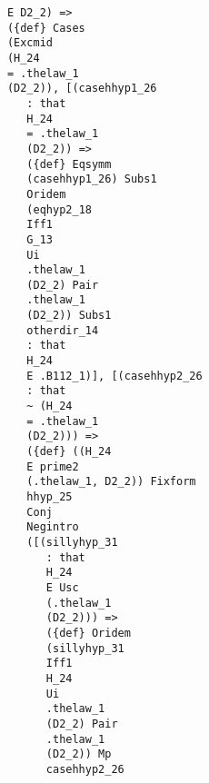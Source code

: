 \documentclass[12pt]{article}
\begin{document}
\begin{verbatim}
                                     E D2_2) => 
                                     ({def} Cases 
                                     (Excmid 
                                     (H_24 
                                     = .thelaw_1 
                                     (D2_2)), [(casehhyp1_26 
                                        : that 
                                        H_24 
                                        = .thelaw_1 
                                        (D2_2)) => 
                                        ({def} Eqsymm 
                                        (casehhyp1_26) Subs1 
                                        Oridem 
                                        (eqhyp2_18 
                                        Iff1 
                                        G_13 
                                        Ui 
                                        .thelaw_1 
                                        (D2_2) Pair 
                                        .thelaw_1 
                                        (D2_2)) Subs1 
                                        otherdir_14 
                                        : that 
                                        H_24 
                                        E .B112_1)], [(casehhyp2_26 
                                        : that 
                                        ~ (H_24 
                                        = .thelaw_1 
                                        (D2_2))) => 
                                        ({def} ((H_24 
                                        E prime2 
                                        (.thelaw_1, D2_2)) Fixform 
                                        hhyp_25 
                                        Conj 
                                        Negintro 
                                        ([(sillyhyp_31 
                                           : that 
                                           H_24 
                                           E Usc 
                                           (.thelaw_1 
                                           (D2_2))) => 
                                           ({def} Oridem 
                                           (sillyhyp_31 
                                           Iff1 
                                           H_24 
                                           Ui 
                                           .thelaw_1 
                                           (D2_2) Pair 
                                           .thelaw_1 
                                           (D2_2)) Mp 
                                           casehhyp2_26 

\end{verbatim}
\end{document}
